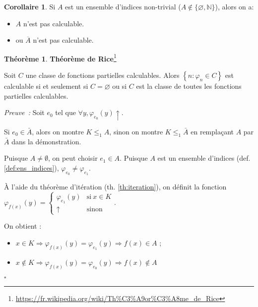 \documentclass{book}
\theoremstyle{definition}
\newtheorem{theorem}{Théorème}
\newtheorem{corollary}{Corollaire}
\numberwithin{lemma}{subsection}
\numberwithin{theorem}{subsection}
\numberwithin{definition}{subsection}
\numberwithin{proposition}{subsection}
\numberwithin{corollary}{subsection}
\numberwithin{property}{subsection}
\numberwithin{example}{subsection}
\numberwithin{heuristique}{subsection}
\numberwithin{scenario}{subsection}
\newenvironment{proofi} {\noindent\emph{Preuve~:}} {\hfill $\square$\vspace{0.2cm}}
\newcommand{\GodelFunc}[1]{\varphi_{#1}}
\begin{document}
            \begin{corollary}
                \par Si $A$ est un ensemble d'indices non-trivial ($A \not\in \{\varnothing, \mathbb{N}\}$), alors on a:
                \begin{itemize}
                    \item $A$ n'est pas calculable.
                    \item ou $\overline{A}$ n'est pas calculable.
                \end{itemize}
            \end{corollary}
            
            \begin{theorem}\textbf{Théorème de Rice}\footnote{\url{https://fr.wikipedia.org/wiki/Th\%C3\%A9or\%C3\%A8me\_de\_Rice}}
                \par Soit $C$ une classe de fonctions partielles calculables. Alors $ \left \{ n : \varphi_n \in C \right \}$ est calculable si et seulement si $C = \varnothing$ ou si $C$ est la classe de toutes les fonctions partielles calculables.
            \end{theorem}
            
            \begin{proofi}
                Soit $e_0$ tel que $\forall y, \GodelFunc{e_0}(y)\uparrow$.
                \par Si $e_0 \in \bar{A}$, alors on montre $K \leq_1 A$, sinon on montre $K \leq_1 \bar{A}$ en remplaçant $A$ par $\bar{A}$ dans la démonstration.
                \par Puisque $A \not= \emptyset$, on peut choisir $e_1 \in A$. Puisque $A$ est un ensemble d'indices (def. \ref{def:ens_indices}), $\GodelFunc{e_0} \not= \GodelFunc{e_1}$.
                \par À l'aide du théorème d'itération (th. \ref{th:iteration}), on définit la fonction $\GodelFunc{f(x)}(y) = \begin{cases}
                    \GodelFunc{e_1}(y) & \mathrm{si~} x \in K \\
                    \uparrow & \mathrm{sinon}
                \end{cases}$.
                \par On obtient :
                \begin{itemize}
                    \item $x \in K \Rightarrow \GodelFunc{f(x)}(y) = \GodelFunc{e_1}(y) \Rightarrow f(x) \in A$ ;
                    \item $x \not\in K \Rightarrow \GodelFunc{f(x)}(y) = \GodelFunc{e_0}(y) \Rightarrow f(x) \not\in A$
                \end{itemize}
            \end{proofi}
            
\end{document}
